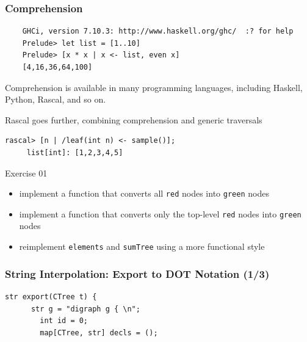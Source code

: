 \documentclass{beamer}
\begin{document}
\begin{frame}[fragile]
  \frametitle{Comprehension}

  \begin{small}
  \begin{verbatim}
    GHCi, version 7.10.3: http://www.haskell.org/ghc/  :? for help
    Prelude> let list = [1..10]
    Prelude> [x * x | x <- list, even x]
    [4,16,36,64,100]    
  \end{verbatim}\end{small} \pause
  
  Comprehension is available in many programming languages\pause,
  including Haskell, Python, Rascal, and so on. \pause 

  \begin{block}{Rascal goes further, combining comprehension and generic traversals}
   \begin{lstlisting}[language=Rascal]
     rascal> [n | /leaf(int n) <- sample()];
     list[int]: [1,2,3,4,5]
   \end{lstlisting}
  \end{block}
  
\end{frame}

\begin{frame}
  \begin{block}{Exercise 01}
    \begin{itemize}
      \item implement a function that converts all \texttt{red} nodes into \texttt{green} nodes
      \item implement a function that converts only the top-level \texttt{red} nodes into \texttt{green} nodes
        \item reimplement \texttt{elements} and \texttt{sumTree} using a more {\color{blue}functional style}   
    \end{itemize}
  \end{block}  
\end{frame}
\begin{frame}[fragile]
  \frametitle{String Interpolation: Export to DOT Notation (1/3)}

    \begin{lstlisting}[language=Rascal]
    str export(CTree t) {
      str g = "digraph g { \n";
        int id = 0;
        map[CTree, str] decls = ();
\end{lstlisting}

\end{frame}
\end{document}
